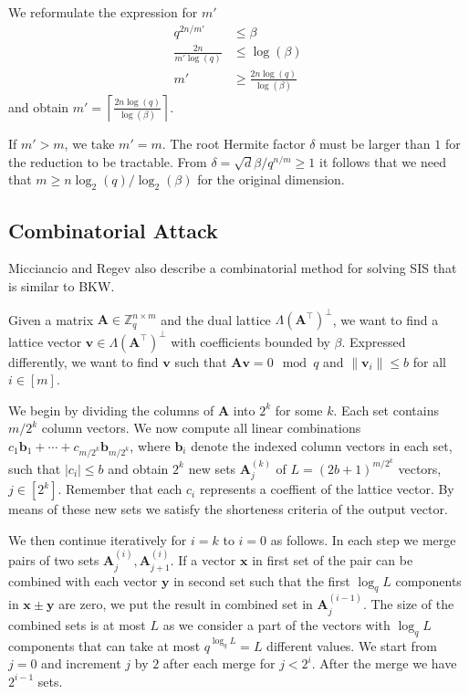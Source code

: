 We reformulate the expression for $m'$
\begin{align}
  q^{2n / m'}           & \leq \beta                          \nonumber       \\
  \frac{2n}{m' \log(q)} & \leq \log(\beta)                          \nonumber \\
  m'                    & \geq \frac{2n \log(q)}{\log(\beta)}
\end{align}
and obtain $m' = \left\lceil \frac{2n \log(q)}{\log(\beta)} \right\rceil$.

If $m' > m$, we take $m' = m$. The root Hermite factor $\delta$ must be larger than $1$ for the reduction to be tractable. From $\delta = \sqrt{d}{\beta / q^{n/m}} \geq 1$ it follows that we need that $m \geq n \log_2(q) / \log_2(\beta)$ for the original dimension.



\subsection[Combinatorial Attack]{Combinatorial Attack \cite{MR09}}\label{sec:combinatorial}
Micciancio and Regev also describe a combinatorial method for solving SIS \cite{MR09} that is similar to BKW.

Given a matrix $\mathbf{A} \in \mathbb{Z}_q^{n \times m}$ and the dual lattice $\Lambda(\mathbf{A}^\intercal)^{\perp}$, we want to find a lattice vector $\mathbf{v} \in \Lambda(\mathbf{A}^\intercal)^{\perp}$ with coefficients bounded by $\beta$. Expressed differently, we want to find $\mathbf{v}$ such that $\mathbf{A}\mathbf{v} = 0 \mod q$ and $\|\mathbf{v}_i\| \leq b$ for all $i \in [m]$.

We begin by dividing the columns of $\mathbf{A}$ into $2^k$ for some $k$. Each set contains $m/2^k$ column vectors. We now compute all linear combinations $c_1 \mathbf{b}_1 + \cdots + c_{m/2^k}\mathbf{b}_{m/2^k}$, where $\mathbf{b}_i$ denote the indexed column vectors in each set, such that $|c_i| \leq b$ and obtain $2^k$ new sets $\mathbf{A}_j^{(k)}$ of $L=(2b+1)^{m/2^k}$ vectors, $j\in \left[2^k\right]$. Remember that each $c_i$ represents a coeffient of the lattice vector. By means of these new sets we satisfy the shorteness criteria of the output vector.

We then continue iteratively for $i=k$ to $i=0$ as follows. In each step we merge pairs of two sets $\mathbf{A}_j^{(i)}, \mathbf{A}_{j+1}^{(i)}$. If a vector $\mathbf{x}$ in first set of the pair can be combined with each vector $\mathbf{y}$ in second set such that the first $\log_q L$ components in $\mathbf{x} \pm \mathbf{y}$ are zero, we put the result in combined set in $\mathbf{A}_j^{(i-1)}$. The size of the combined sets is at most $L$ as we consider a part of the vectors with $\log_q L$ components that can take at most $q^{\log_q L} = L$ different values. We start from $j=0$ and increment $j$ by $2$ after each merge for $j<2^i$.
After the merge we have $2^{i-1}$ sets.

